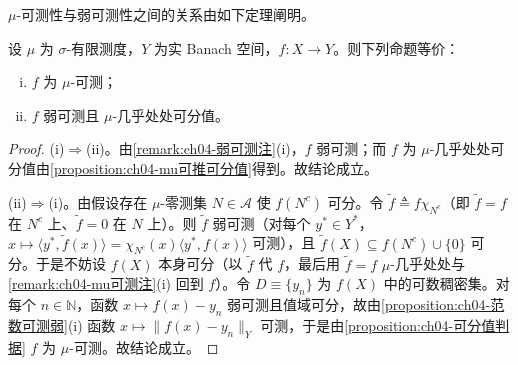 \documentclass[../../main.tex]{subfiles}%
\begin{document}
$\mu$-可测性与弱可测性之间的关系由如下定理阐明。

\begin{theorem}[Pettis]\label{theorem:ch04-Pettis}
设 $\mu$ 为 $\sigma$-有限测度，$Y$ 为实 Banach 空间，$f:X\to Y$。则下列命题等价：
\begin{enumerate}[(i)]
\item\label{item:ch04-Pettis-i} $f$ 为 $\mu$-可测；
\item\label{item:ch04-Pettis-ii} $f$ 弱可测且 $\mu$-几乎处处可分值。
\end{enumerate}
\end{theorem}

\begin{proof}
(i)$\Rightarrow$(ii)。由\cref{remark:ch04-弱可测注}(i)，$f$ 弱可测；而 $f$ 为 $\mu$-几乎处处可分值由\cref{proposition:ch04-mu可推可分值}得到。故结论成立。

(ii)$\Rightarrow$(i)。由假设存在 $\mu$-零测集 $N\in\mathcal{A}$ 使 $f(N^c)$ 可分。令 $\tilde f\triangleq f\chi_{N^c}$（即 $\tilde f=f$ 在 $N^c$ 上、$\tilde f=0$ 在 $N$ 上）。则 $\tilde f$ 弱可测（对每个 $y^*\in Y^*$，$x\mapsto\langle y^*,\tilde f(x)\rangle=\chi_{N^c}(x)\langle y^*,f(x)\rangle$ 可测），且 $\tilde f(X)\subseteq f(N^c)\cup\{0\}$ 可分。于是不妨设 $f(X)$ 本身可分（以 $\tilde f$ 代 $f$，最后用 $\tilde f=f$ $\mu$-几乎处处与\cref{remark:ch04-mu可测注}(i) 回到 $f$）。令 $D\equiv\{y_n\}$ 为 $f(X)$ 中的可数稠密集。对每个 $n\in\mathbb{N}$，函数 $x\mapsto f(x)-y_n$ 弱可测且值域可分，故由\cref{proposition:ch04-范数可测弱}(i) 函数 $x\mapsto\|f(x)-y_n\|_Y$ 可测，于是由\cref{proposition:ch04-可分值判据} $f$ 为 $\mu$-可测。故结论成立。
\end{proof}
\end{document}
